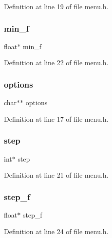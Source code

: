 Definition at line 19 of file menu.\+h.

\mbox{\label{structmenu_a52d27cf45e46c52138c1a6bc4e46773d}} 
\subsubsection{\texorpdfstring{min\+\_\+f}{min\_f}}
{\footnotesize\ttfamily float$\ast$ min\+\_\+f}



Definition at line 22 of file menu.\+h.

\mbox{\label{structmenu_afefe8f715b91a6c68097ec7503dd6020}} 
\subsubsection{\texorpdfstring{options}{options}}
{\footnotesize\ttfamily char$\ast$$\ast$ options}



Definition at line 17 of file menu.\+h.

\mbox{\label{structmenu_a985265c90800ba09664f71e134dd5786}} 
\subsubsection{\texorpdfstring{step}{step}}
{\footnotesize\ttfamily int$\ast$ step}



Definition at line 21 of file menu.\+h.

\mbox{\label{structmenu_ad30508910252066b5c8e1c574080b736}} 
\subsubsection{\texorpdfstring{step\+\_\+f}{step\_f}}
{\footnotesize\ttfamily float$\ast$ step\+\_\+f}



Definition at line 24 of file menu.\+h.

\mbox{\label{structmenu_ae131df142b529116ec8300a3c59b14be}} 
